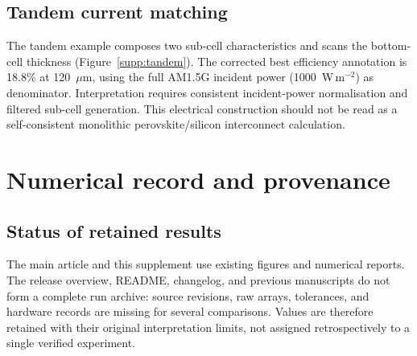 \documentclass[11pt,a4paper]{article}
\numberwithin{equation}{section}
\begin{document}
\subsection{Tandem current matching}
The tandem example composes two sub-cell characteristics and scans the
bottom-cell thickness (Figure~\ref{supp:tandem}). The corrected best
efficiency annotation is 18.8\% at 120~$\mu$m, using the full AM1.5G
incident power (1000~W\,m$^{-2}$) as denominator. Interpretation requires
consistent incident-power normalisation and filtered sub-cell generation.
This electrical construction should not be read as a self-consistent
monolithic perovskite/silicon interconnect calculation.

\section{Numerical record and provenance}\label{supp:provenance}
\subsection{Status of retained results}
The main article and this supplement use existing figures and numerical
reports. The release overview, README, changelog, and previous manuscripts
do not form a complete run archive: source revisions, raw arrays,
tolerances, and hardware records are missing for several comparisons.
Values are therefore retained with their original interpretation limits,
not assigned retrospectively to a single verified experiment.
\end{document}
